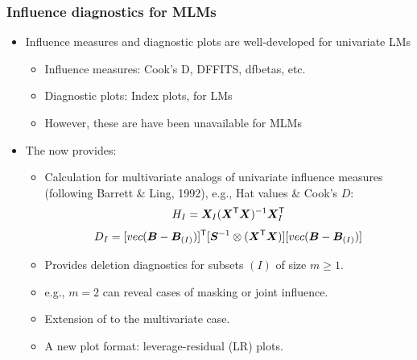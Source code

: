 \begin{frame}
  \frametitle{Influence diagnostics for MLMs}

  \begin{itemize}
  \item Influence measures and diagnostic plots are well-developed for univariate LMs
    \begin{itemize}
    \item Influence measures: Cook's D, DFFITS, dfbetas, etc.
    \item Diagnostic plots:  Index plots,  for LMs
    \item However, these are have been unavailable for MLMs  
    \end{itemize}
  \item
    The  now provides:
    \begin{itemize}
    \item Calculation for multivariate analogs of univariate influence measures
    (following Barrett \& Ling, 1992), e.g., Hat values \& Cook's $D$:
    \begin{equation}
    	H_I = \bm{X}_I
    	      (\bm{X}^\mathsf{T}\bm{X})^{-1}
    	      \bm{X}_I^\mathsf{T}
    \end{equation}
    \begin{equation}
    	D_I = [vec(\bm{B} - \bm{B}_{(I)})]^\mathsf{T}
    	      [\bm{S}^{-1} \otimes (\bm{X}^\mathsf{T}\bm{X})]
    	      [vec(\bm{B} - \bm{B}_{(I)})]
    \end{equation}
    \item Provides deletion diagnostics for subsets $(I)$ of size $m \ge 1$.
    \item e.g., $m=2$ can reveal cases of \alert{masking} or \alert{joint influence}.
    \item Extension of  to the multivariate case.
    \item A new plot format: leverage-residual (LR) plots.
    \end{itemize}
  \end{itemize}
\end{frame}

